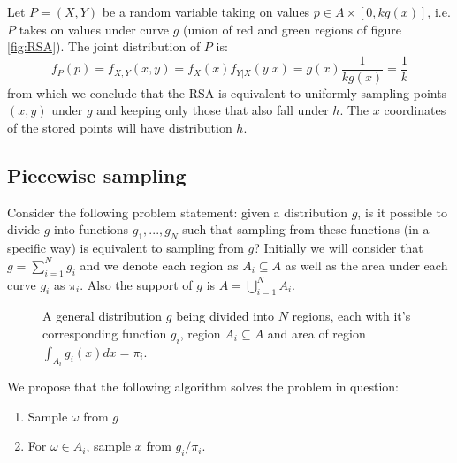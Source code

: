\documentclass[11pt,onecolumn]{article}
\let\oldref\ref%
\def\ref{\oldref*}}
\begin{document}
Let $P=(X,Y)$ be a random variable taking on values $p\in A\times [0,kg(x)]$, i.e. $P$ takes on values under curve $g$ (union of red and green regions of figure \ref{fig:RSA}). The joint distribution of $P$ is:
$$f_P(p)=f_{X,Y}(x,y)=f_X(x)f_{Y|X}(y|x)=g(x)\frac{1}{kg(x)}=\frac{1}{k}$$
from which we conclude that the RSA is equivalent to uniformly sampling points $(x,y)$ under $g$ and keeping only those that also fall under $h$. The $x$ coordinates of the stored points will have distribution $h$.

\subsection{Piecewise sampling}
Consider the following problem statement: given a distribution $g$, is it possible to divide $g$ into functions $g_1, ..., g_N$ such that sampling from these functions (in a specific way) is equivalent to sampling from $g$? Initially we will consider that $g=\sum_{i=1}^N g_i$ and we denote each region as $A_i\subseteq A$ as well as the area under each curve $g_i$ as $\pi_i$. Also the support of $g$ is $A=\bigcup_{i=1}^N A_i$.

\begin{figure}[h]
\centering
{}
\caption{A general distribution $g$ being divided into $N$ regions, each with it's corresponding function $g_i$, region $A_i\subseteq A$ and area of region $\int_{A_i} g_i(x)dx=\pi_i$.}
\label{fig:psampling}
\end{figure}

We propose that the following algorithm solves the problem in question:
\begin{enumerate}
	\item Sample $\omega$ from $g$
	\item For $\omega\in A_i$, sample $x$ from $g_i/\pi_i$.
\end{enumerate}
\end{document}

